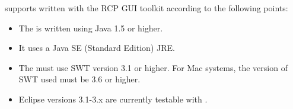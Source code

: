 \app{} supports \gdauts{} written with the RCP GUI toolkit according to the following points:


\begin{itemize}
\item The \gdaut{} is written using Java 1.5 or higher. 
\item It uses a Java SE (Standard Edition) JRE.
\item The \gdaut{} must use SWT version 3.1 or higher. For Mac systems, the version of SWT used must be 3.6 or higher. 
\item Eclipse versions 3.1-3.x are currently testable with \app{}.
\end{itemize}
